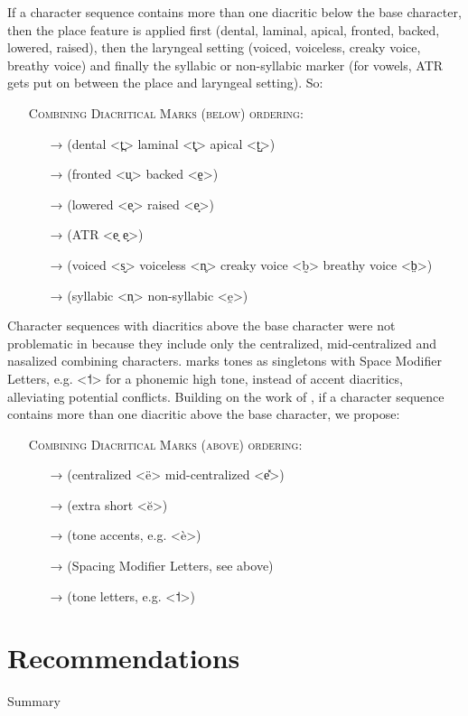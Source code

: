 If a character sequence contains more than one diacritic below the base
character, then the place feature is applied first (dental, laminal, apical,
fronted, backed, lowered, raised), then the laryngeal setting (voiced,
voiceless, creaky voice, breathy voice) and finally the syllabic or non-syllabic
marker (for vowels, ATR gets put on between the place and laryngeal setting).
So:

\begin{itemize}
	\item[] \textsc{Combining Diacritical Marks (below) ordering:}
	\begin{itemize}	
	  \item[→] (dental <t̪> \textbar{} laminal <t̻> \textbar{} apical <t̺>) 
	  \item[→] (fronted <u̟> \textbar{} backed <e̠>)
	  \item[→] (lowered <e̞> \textbar{} raised <e̝>) 
	  \item[→] (ATR <e̘ e̙>)
	  \item[→] (voiced <s̬> \textbar{} voiceless <n̥> \textbar{} creaky voice <b̰> \textbar{} breathy voice <b̤>)
	  \item[→] (syllabic <n̩> \textbar{} non-syllabic <e̯>)
	\end{itemize}
 \end{itemize}

Character sequences with diacritics above the base character were not
problematic in \citet{Moran2012} because they include only the centralized,
mid-centralized and nasalized combining characters. \citet{Moran2012} marks
tones as singletons with Space Modifier Letters, e.g. \textless{}˦\textgreater{}
for a phonemic high tone, instead of accent diacritics, alleviating potential
conflicts. Building on the work of \citet{Moran2012}, if a character sequence
contains more than one diacritic above the base character, we propose:

\begin{itemize}
	\item[] \textsc{Combining Diacritical Marks (above) ordering:}
	\begin{itemize}
	  \item[→] (centralized <ë> \textbar{} mid-centralized <e̽>)
	  \item[→] (extra short <ĕ>)
	  \item[→] (tone accents, e.g. <è>)
	  \item[→] (Spacing Modifier Letters, see above)
	  \item[→] (tone letters, e.g. <˦>)
	\end{itemize}	 
\end{itemize}

\section{Recommendations}
\label{ipa-recommendations}

Summary


